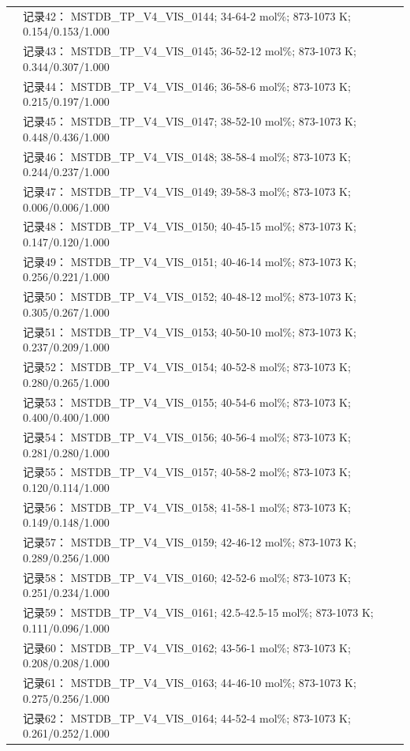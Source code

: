 \documentclass[12pt]{article}
\begin{document}
{\begin{longtable}[]{@{}
  >{\raggedright\arraybackslash}p{}
  >{\raggedright\arraybackslash}p{}@{}}
 & 记录42： MSTDB\_TP\_V4\_VIS\_0144; 34-64-2 mol\%; 873-1073 K; 0.154/0.153/1.000 \\
 & 记录43： MSTDB\_TP\_V4\_VIS\_0145; 36-52-12 mol\%; 873-1073 K; 0.344/0.307/1.000 \\
 & 记录44： MSTDB\_TP\_V4\_VIS\_0146; 36-58-6 mol\%; 873-1073 K; 0.215/0.197/1.000 \\
 & 记录45： MSTDB\_TP\_V4\_VIS\_0147; 38-52-10 mol\%; 873-1073 K; 0.448/0.436/1.000 \\
 & 记录46： MSTDB\_TP\_V4\_VIS\_0148; 38-58-4 mol\%; 873-1073 K; 0.244/0.237/1.000 \\
 & 记录47： MSTDB\_TP\_V4\_VIS\_0149; 39-58-3 mol\%; 873-1073 K; 0.006/0.006/1.000 \\
 & 记录48： MSTDB\_TP\_V4\_VIS\_0150; 40-45-15 mol\%; 873-1073 K; 0.147/0.120/1.000 \\
 & 记录49： MSTDB\_TP\_V4\_VIS\_0151; 40-46-14 mol\%; 873-1073 K; 0.256/0.221/1.000 \\
 & 记录50： MSTDB\_TP\_V4\_VIS\_0152; 40-48-12 mol\%; 873-1073 K; 0.305/0.267/1.000 \\
 & 记录51： MSTDB\_TP\_V4\_VIS\_0153; 40-50-10 mol\%; 873-1073 K; 0.237/0.209/1.000 \\
 & 记录52： MSTDB\_TP\_V4\_VIS\_0154; 40-52-8 mol\%; 873-1073 K; 0.280/0.265/1.000 \\
 & 记录53： MSTDB\_TP\_V4\_VIS\_0155; 40-54-6 mol\%; 873-1073 K; 0.400/0.400/1.000 \\
 & 记录54： MSTDB\_TP\_V4\_VIS\_0156; 40-56-4 mol\%; 873-1073 K; 0.281/0.280/1.000 \\
 & 记录55： MSTDB\_TP\_V4\_VIS\_0157; 40-58-2 mol\%; 873-1073 K; 0.120/0.114/1.000 \\
 & 记录56： MSTDB\_TP\_V4\_VIS\_0158; 41-58-1 mol\%; 873-1073 K; 0.149/0.148/1.000 \\
 & 记录57： MSTDB\_TP\_V4\_VIS\_0159; 42-46-12 mol\%; 873-1073 K; 0.289/0.256/1.000 \\
 & 记录58： MSTDB\_TP\_V4\_VIS\_0160; 42-52-6 mol\%; 873-1073 K; 0.251/0.234/1.000 \\
 & 记录59： MSTDB\_TP\_V4\_VIS\_0161; 42.5-42.5-15 mol\%; 873-1073 K; 0.111/0.096/1.000 \\
 & 记录60： MSTDB\_TP\_V4\_VIS\_0162; 43-56-1 mol\%; 873-1073 K; 0.208/0.208/1.000 \\
 & 记录61： MSTDB\_TP\_V4\_VIS\_0163; 44-46-10 mol\%; 873-1073 K; 0.275/0.256/1.000 \\
 & 记录62： MSTDB\_TP\_V4\_VIS\_0164; 44-52-4 mol\%; 873-1073 K; 0.261/0.252/1.000 \\

\end{longtable}}
\end{document}
